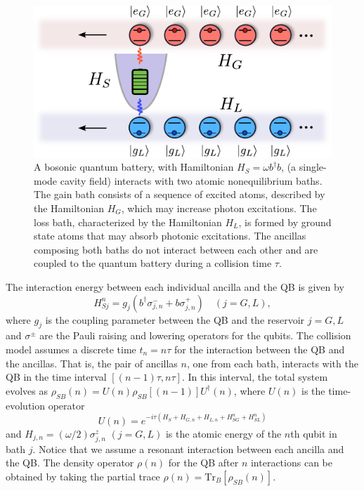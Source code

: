 \documentclass[%
reprint,
superscriptaddress,
amsmath,amssymb,
aps,
pra,
]{revtex4-2}
\begin{document}
\begin{figure}[H]
\includegraphics[width=0.9\linewidth]{fig1.pdf}
\caption{A bosonic quantum battery, with Hamiltonian $H_S = \omega b^{\dagger}b$, (a single-mode cavity field) interacts with two atomic nonequilibrium baths. The gain bath consists of a sequence of excited atoms, described by the Hamiltonian $H_G$, which may increase photon excitations. The loss bath, characterized by the Hamiltonian $H_L$, is formed by ground state atoms that may absorb photonic excitations. The ancillas composing both baths do not interact between each other and are coupled to the quantum battery during a collision time $\tau$.}
\label{fig1} 
\end{figure}

The interaction energy between each individual ancilla and the QB is given by 
\begin{equation}
    H_{Sj}^n = g_j(b^{\dagger} \sigma_{j,n}^{-} + b\sigma_{j,n}^{+}) \quad (j = G,L),
\end{equation}
where $g_j$ is the coupling parameter between the QB and the reservoir $j=G,L$ and $\sigma^{\pm}$ are the Pauli raising and lowering operators for the qubits. The collision model assumes a discrete time $t_n = n\tau$ for the interaction between the QB and the ancillas. That is, the pair of ancillas $n$, one from each bath, interacts with the QB in the time interval $[(n-1)\tau, n\tau]$. In this interval, the total system evolves as $\rho_{SB}(n) = U(n) \rho_{SB}[(n-1)] U^{\dagger}(n)$, where $U(n)$ is the time-evolution operator
\begin{equation}
    U(n) = e^{-i\tau(H_S + H_{G,n} + H_{L,n} + H^n_{SG} + H^n_{SL})}
\end{equation} 
and $H_{j,n} = (\omega/2)\sigma^{z}_{j,n}$ $(j=G,L)$ is the atomic energy of the $n$th qubit in bath $j$. Notice that we assume a resonant interaction between each ancilla and the QB. The density operator $\rho(n)$ for the QB after $n$ interactions can be obtained by taking the partial trace $\rho(n) = \text{Tr}_{B}[\rho_{SB}(n)]$.
\end{document}
